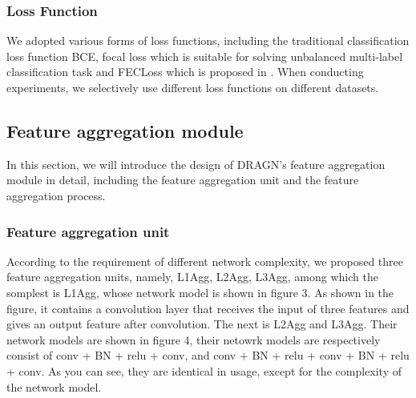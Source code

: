 \documentclass[10pt,twocolumn,letterpaper]{article}
\begin{document}
\subsubsection{Loss Function}
We adopted various forms of loss functions, including the traditional classification loss function BCE, focal loss which is suitable for solving unbalanced multi-label classification task and FECLoss which is proposed in \cite{ref27}. When conducting experiments, we selectively use different loss functions on different datasets.

\subsection{Feature aggregation module}
In this section, we will introduce the design of DRAGN's feature aggregation module in detail, including the feature aggregation unit and the feature aggregation process.

\subsubsection{Feature aggregation unit}
According to the requirement of different network complexity, we proposed three feature aggregation units, namely, L1Agg, L2Agg, L3Agg, among which the somplest is L1Agg, whose network model is shown in figure 3. As shown in the figure, it contains a convolution layer that receives the input of three features and gives an output feature after convolution. The next is L2Agg and L3Agg. Their network models are shown in figure 4, their netowrk models are respectively consist of conv + BN + relu + conv, and conv + BN + relu + conv + BN + relu + conv. As you can see, they are identical in usage, except for the complexity of the network model.
\end{document}

